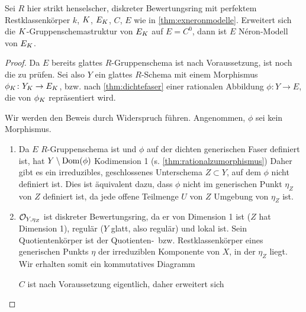 \documentclass[german]{scrreprt}
\begin{document}
\begin{Lemma}\label{thm:fallstriktehenselisierung}
  Sei $R$ hier strikt henselscher, diskreter Bewertungsring mit
  perfektem Restklassenkörper $k$, $K$, $E_{K}$, $C$, $E$ wie in
  \autoref{thm:exneronmodelle}.
  Erweitert sich die $K$-Gruppenschemastruktur von $E_{K}$ auf
  $E=C^0$, dann ist $E$ Néron-Modell von $E_{K}$.
  \begin{proof}
    Da $E$ bereits glattes $R$-Gruppenschema ist nach Voraussetzung,
    ist noch die \NAbbEig zu prüfen.
    Sei also $Y$ ein glattes $R$-Schema mit einem Morphismus
    $\phi_{K}\colon Y_{K}\to E_{K}$, bzw. nach \autoref{thm:dichtefaser}
    einer rationalen Abbildung $\phi\colon Y\to E$, die von $\phi_{K}$
    repräsentiert wird.

    Wir werden den Beweis durch Widerspruch führen.
    Angenommen, $\phi$ sei kein Morphismus.
    \begin{enumerate}
    \item Da $E$ $R$-Gruppenschema ist und $\phi$ auf der dichten
      generischen Faser definiert ist, hat $Y\setminus\operatorname{Dom}(\phi)$
      Kodimension 1 (s. \autoref{thm:rationalzumorphismus})
      Daher gibt es ein irreduzibles, geschlossenes Unterschema
      $Z\subset Y$, auf dem $\phi$ nicht definiert ist.
      Dies ist äquivalent dazu, dass $\phi$ nicht im generischen Punkt
      $\eta_Z$ von $Z$ definiert ist, da jede offene Teilmenge $U$ von
      $Z$ Umgebung von $\eta_Z$ ist.
    \item $\mathcal{O}_{Y,\eta_Z}$ ist diskreter Bewertungsring, da er von
      Dimension 1 ist ($Z$ hat Dimension 1), regulär ($Y$ glatt, also
      regulär) und lokal ist.
      Sein Quotientenkörper ist der Quotienten-~bzw. Restklassenkörper
      eines generischen Punkts $\eta$ der irreduziblen Komponente von
      $X$, in der $\eta_Z$ liegt. Wir erhalten somit ein kommutatives
      Diagramm
      \begin{center}
      \end{center}
      $C$ ist nach Voraussetzung eigentlich, daher erweitert sich

\end{enumerate}
\end{proof}
\end{Lemma}
\end{document}
